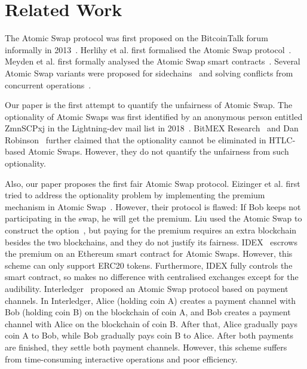 \section{Related Work}
\label{sec:related_work}

The Atomic Swap protocol was first proposed on the BitcoinTalk forum informally in 2013~\cite{nolan2013alt}.
Herlihy et al. first formalised the Atomic Swap protocol~\cite{herlihy2018atomic}.
Meyden et al. first formally analysed the Atomic Swap smart contracts~\cite{van2018specification}.
Several Atomic Swap variants were proposed for sidechains~\cite{robinson2019atomic} and solving conflicts from concurrent operations~\cite{zakhary2019atomic}.

Our paper is the first attempt to quantify the unfairness of Atomic Swap.
The optionality of Atomic Swaps was first identified by an anonymous person entitled ZmnSCPxj in the Lightning-dev mail list in 2018~\cite{optionality-origin}.
BitMEX Research~\cite{bitmex-inadvertent-call-option} and Dan Robinson~\cite{htlcs-considered-harmful} further claimed that the optionality cannot be eliminated in HTLC-based Atomic Swaps.
However, they do not quantify the unfairness from such optionality.

Also, our paper proposes the first fair Atomic Swap protocol.
Eizinger et al. first tried to address the optionality problem by implementing the premium mechanism in Atomic Swap~\cite{first-attempt-optionality}. However, their protocol is flawed: If Bob keeps not participating in the swap, he will get the premium.
Liu used the Atomic Swap to construct the option~\cite{liu2018atomic}, but paying for the premium requires an extra blockchain besides the two blockchains, and they do not justify its fairness.
IDEX~\cite{idex-whitepaper} escrows the premium on an Ethereum smart contract for Atomic Swaps. However, this scheme can only support ERC20 tokens. Furthermore, IDEX fully controls the smart contract, so makes no difference with centralised exchanges except for the audibility.
Interledger~\cite{interledger-whitepaper} proposed an Atomic Swap protocol based on payment channels.
In Interledger, Alice (holding coin A) creates a payment channel with Bob (holding coin B) on the blockchain of coin A, and Bob creates a payment channel with Alice on the blockchain of coin B. After that, Alice gradually pays coin A to Bob, while Bob gradually pays coin B to Alice. After both payments are finished, they settle both payment channels.
However, this scheme suffers from time-consuming interactive operations and poor efficiency.